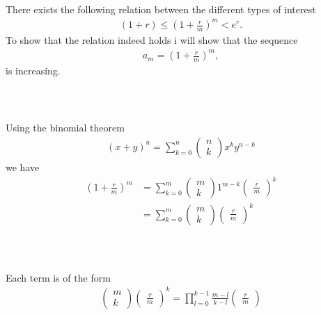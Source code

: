 \documentclass{beamer}
\numberwithin{equation}{section}
\begin{document}
\begin{frame}\frametitle{{\normalsize \secname} \\ {\large \subsecname}}
    There exists the following relation between the different types of interest
    \begin{align}
        (1 + r) \leq \left(1 + \frac{r}{m}\right)^m < e^r.
    \end{align}
    To show that the relation indeed holds i will show that the sequence
    \begin{align}
        a_m = \left(1 + \frac{r}{m}\right)^m,
    \end{align}
    is increasing.
\end{frame}

\begin{frame}\frametitle{{\normalsize \secname} \\ {\large \subsecname}}
    Using the binomial theorem
    \begin{align*}
        (x+y)^n = \sum_{k=0}^n \begin{pmatrix} n \\ k \end{pmatrix} x^k y^{n-k}
    \end{align*}
    we have
    \begin{align*}
        \left( 1 + \frac{r}{m} \right)^m &= \sum_{k=0}^m \begin{pmatrix} m \\ k \end{pmatrix} 1^{m-k}\begin{pmatrix} \frac{r}{m} \end{pmatrix}^k\\
        &= \sum_{k=0}^m \begin{pmatrix} m \\ k \end{pmatrix} \begin{pmatrix} \frac{r}{m} \end{pmatrix}^k
    \end{align*}
\end{frame}

\begin{frame}\frametitle{{\normalsize \secname} \\ {\large \subsecname}}
    Each term is of the form
    \begin{align*}
        \begin{pmatrix} m \\ k \end{pmatrix}\begin{pmatrix} \frac{r}{m} \end{pmatrix}^k = \prod_{l=0}^{k-1} \frac{m-l}{k - l} \begin{pmatrix} \frac{r}{m} \end{pmatrix}
    \end{align*}
\end{frame}
\end{document}
